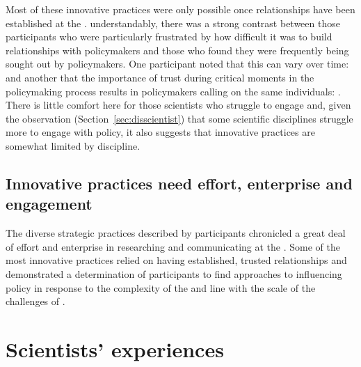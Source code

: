 Most of these innovative practices were only possible once relationships have been established at the \SPI{}. understandably, there was a strong contrast between those participants who were particularly frustrated by how difficult it was to build relationships with policymakers and those who found they were frequently being sought out by policymakers. One participant noted that this can vary over time:  and another that the importance of trust during critical moments in the policymaking process results in policymakers calling on the same individuals: . There is little comfort here for those scientists who struggle to engage and, given the observation (Section~\ref{sec:disscientist}) that some scientific disciplines struggle more to engage with policy, it also suggests that innovative practices are somewhat limited by discipline.

\subsection{Innovative practices need effort, enterprise and engagement}

The diverse strategic practices described by participants chronicled a great deal of effort and enterprise in researching and communicating at the \SPI. Some of the most innovative practices relied on having established, trusted relationships and demonstrated a determination of participants to find approaches to influencing policy in response to the complexity of the \SPI{} and line with the scale of the challenges of \CAN.

\section{Scientists' experiences}\label{sec:disexperience}

